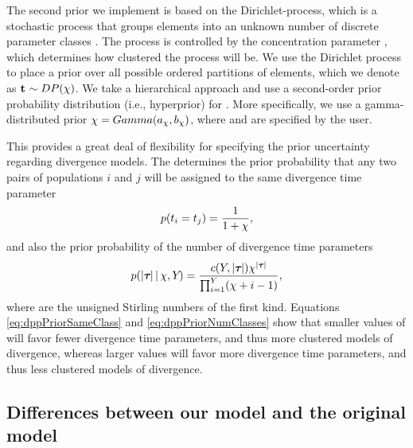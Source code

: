 \documentclass[letterpaper,12pt]{article}
\begin{document}
\begin{linenumbers}
The second prior we implement is based on the Dirichlet-process, which is a
stochastic process that groups elements into an unknown number of discrete
parameter classes \citep{Ferguson1973,Antoniak1974}.
The process is controlled by the concentration parameter \concentrationParam,
which determines how clustered the process will be.
We use the Dirichlet process to place a prior over all possible ordered
partitions of \npairs{} elements, which we denote as $\mathbf{t_{}} \sim
DP(\chi )$.
We take a hierarchical approach and use a second-order prior probability
distribution (i.e., hyperprior) for \concentrationParam.
More specifically, we use a gamma-distributed prior $\chi =
Gamma(a_{\chi}, b_{\chi})$,
where \gammaShape{\concentrationParam} and \gammaScale{\concentrationParam} are
specified by the user.

\begin{linenomath}
This provides a great deal of flexibility for specifying the prior uncertainty
regarding divergence models.
The \concentrationParam determines the prior probability that any two
pairs of populations $i$ and $j$ will be assigned to the same divergence time
parameter
\begin{equation}
    p(t_{i} = t_{j}) = \frac{1}{1 + \chi},
    \label{eq:dppPriorSameClass}
\end{equation}
and also the prior probability of the number of divergence time parameters
\begin{equation}
    p(\lvert \boldsymbol{\tau_{}} \rvert \,|\, \chi, Y_{}) = 
    \frac{c(Y_{}, \lvert \boldsymbol{\tau_{}} \rvert) \chi^{\lvert \boldsymbol{\tau_{}} \rvert}}
    {\prod_{i=1}^{Y_{}}(\chi + i - 1)},
    \label{eq:dppPriorNumClasses}
\end{equation}
where \stirlingFirst{\cdot}{\cdot} are the unsigned Stirling numbers of the
first kind.
Equations \ref{eq:dppPriorSameClass} and \ref{eq:dppPriorNumClasses} show that
smaller values of \concentrationParam will favor fewer divergence time
parameters, and thus more clustered models of divergence, whereas larger values
will favor more divergence time parameters, and thus less clustered models of
divergence.
\end{linenomath}

\subsection*{Differences between our model and the original \msb model}

\end{linenumbers}
\end{document}
